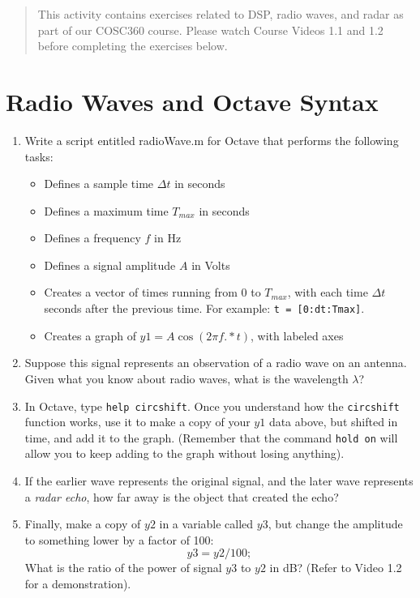\documentclass[12pt]{article}
\begin{document}
\maketitle

\begin{abstract}
This activity contains exercises related to DSP, radio waves, and radar as part of our COSC360 course.  Please watch Course Videos 1.1 and 1.2 before completing the exercises below.
\end{abstract}

\section{Radio Waves and Octave Syntax}

\begin{enumerate}
\item Write a script entitled radioWave.m for Octave that performs the following tasks:
\begin{itemize}
\item Defines a sample time $\Delta t$ in seconds
\item Defines a maximum time $T_{max}$ in seconds
\item Defines a frequency $f$ in Hz
\item Defines a signal amplitude $A$ in Volts
\item Creates a vector of times running from  0 to $T_{max}$, with each time $\Delta t$ seconds after the previous time.  For example: \verb+t = [0:dt:Tmax]+.
\item Creates a graph of $y1 = A\cos(2\pi f .* t)$, with labeled axes
\end{itemize}
\item Suppose this signal represents an observation of a radio wave on an antenna.  Given what you know about radio waves, what is the wavelength $\lambda$?
\item In Octave, type \verb+help circshift+.  Once you understand how the \verb+circshift+ function works, use it to make a copy of your $y1$ data above, but shifted in time, and add it to the graph. (Remember that the command \verb+hold on+ will allow you to keep adding to the graph without losing anything).
\item If the earlier wave represents the original signal, and the later wave represents a \textit{radar echo}, how far away is the object that created the echo?
\item Finally, make a copy of $y2$ in a variable called $y3$, but change the amplitude to something lower by a factor of 100:
\begin{equation}
y3 = y2/100;
\end{equation}
What is the ratio of the power of signal $y3$ to $y2$ in dB? (Refer to Video 1.2 for a demonstration).
\end{enumerate}
\end{document}
